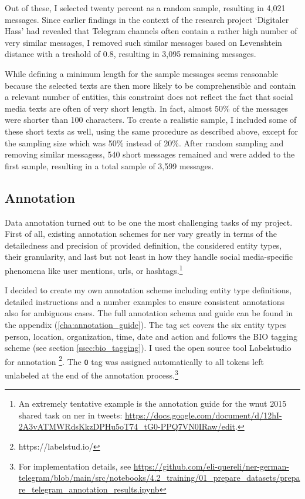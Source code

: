 Out of these, I selected twenty percent as a random sample, resulting in 4,021 messages. Since earlier findings in the context of the research project `Digitaler Hass' had revealed that Telegram channels often contain a rather high number of very similar messages, I removed such similar messages based on Levenshtein distance with a treshold of 0.8, resulting in 3,095 remaining messages.

While defining a minimum length for the sample messages seems reasonable because the selected texts are then more likely to be comprehensible and contain a relevant number of entities, this constraint does not reflect the fact that social media texts are often of very short length. In fact, almost 50\% of the messages were shorter than 100 characters. To create a realistic sample, I included some of these short texts as well, using the same procedure as described above, except for the sampling size which was 50\% instead of 20\%. After random sampling and removing similar messagess, 540 short messages remained and were added to the first sample, resulting in a total sample of 3,599 messages.

\subsection{Annotation}
Data annotation turned out to be one the most challenging tasks of my project. First of all, existing annotation schemes for \gls{ner} vary greatly in terms of the detailedness and precision of provided definition, the considered entity types, their granularity, and last but not least in how they handle social media-specific phenomena like user mentions, urls, or hashtags.\footnote{An extremely tentative example is the annotation guide for the \gls{wnut} 2015 shared task on \gls{ner} in tweets: \url{https://docs.google.com/document/d/12hI-2A3vATMWRdsKkzDPHu5oT74_tG0-PPQ7VN0IRaw/edit}.}

I decided to create my own annotation scheme including entity type definitions, detailed instructions and a number examples to ensure consistent annotations also for ambiguous cases. The full annotation schema and guide can be found in the appendix (\ref{cha:annotation_guide}). The tag set covers the six entity types person, location, organization, time, date and action and follows the BIO tagging scheme (see section \ref{ssec:bio_tagging}). 
I used the open source tool Labelstudio for annotation \footnote{https://labelstud.io/}. The \verb|O| tag was assigned automatically to all tokens left unlabeled at the end of the annotation process.\footnote{For implementation details, see \url{https://github.com/eli-quereli/ner-german-telegram/blob/main/src/notebooks/4.2_training/01_prepare_datasets/prepare_telegram_annotation_results.ipynb}}

